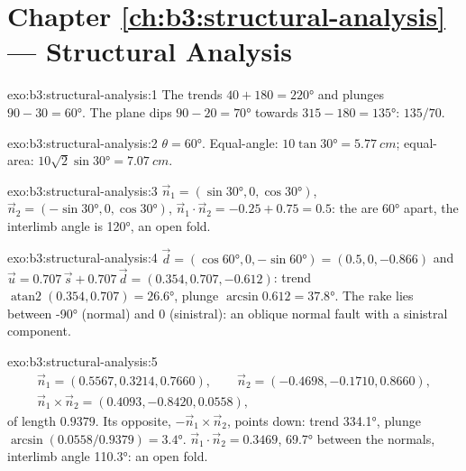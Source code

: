 \section*{Chapter \ref{ch:b3:structural-analysis} --- Structural Analysis}

\begin{solution}{exo:b3:structural-analysis:1}
The  trends $40 + 180 = \ang{220}$ and plunges $90 - 30 = \ang{60}$. The
plane dips $90 - 20 = \ang{70}$ towards $315 - 180 = \ang{135}$: $135/70$.
\end{solution}

\begin{solution}{exo:b3:structural-analysis:2}
$\theta = \ang{60}$. Equal-angle: $10\tan\ang{30} = \qty{5.77}{cm}$;
equal-area: $10\sqrt2\sin\ang{30} = \qty{7.07}{cm}$.
\end{solution}

\begin{solution}{exo:b3:structural-analysis:3}
$\vec n_1 = (\sin\ang{30}, 0, \cos\ang{30})$, $\vec n_2 = (-\sin\ang{30}, 0,
\cos\ang{30})$, $\vec n_1\cdot\vec n_2 = -0.25 + 0.75 = 0.5$: the  are
\ang{60} apart, the interlimb angle is \ang{120}, an open fold.
\end{solution}

\begin{solution}{exo:b3:structural-analysis:4}
$\vec d = (\cos\ang{60}, 0, -\sin\ang{60}) = (0.5, 0, -0.866)$ and $\vec u =
0.707\,\vec s + 0.707\,\vec d = (0.354, 0.707, -0.612)$: trend
$\operatorname{atan2}(0.354, 0.707) = \ang{26.6}$, plunge $\arcsin0.612 =
\ang{37.8}$. The rake lies between \ang{-90} (normal) and 0 (sinistral): an
oblique normal fault with a sinistral component.
\end{solution}

\begin{solution}{exo:b3:structural-analysis:5}
\begin{gather*}
  \vec n_1 = (0.5567, 0.3214, 0.7660),\qquad \vec n_2 = (-0.4698, -0.1710, 0.8660),\\
  \vec n_1\times\vec n_2 = (0.4093, -0.8420, 0.0558),
\end{gather*}
of length $0.9379$. Its opposite, $-\vec n_1\times\vec n_2$, points down:
trend \ang{334.1}, plunge $\arcsin(0.0558/0.9379) = \ang{3.4}$. $\vec n_1\cdot\vec
n_2 = 0.3469$, \ang{69.7} between the normals, interlimb angle \ang{110.3}:
an open fold.
\end{solution}


